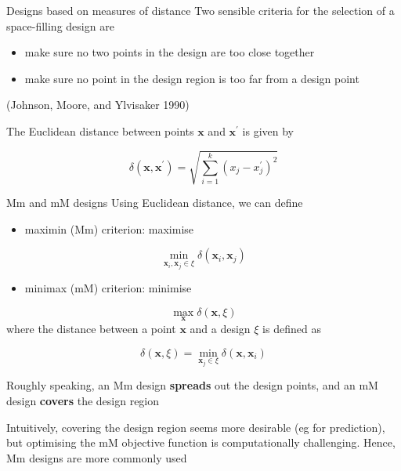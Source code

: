 \documentclass[
  ignorenonframetext,
]{beamer}
\providecommand{\tightlist}{%
  \setlength{\itemsep}{0pt}\setlength{\parskip}{0pt}}
\begin{document}
\begin{frame}{Designs based on measures of distance}
\protect\hypertarget{designs-based-on-measures-of-distance}{}
Two sensible criteria for the selection of a space-filling design are

\begin{itemize}
\tightlist
\item
  make sure no two points in the design are too close together
\item
  make sure no point in the design region is too far from a design point
\end{itemize}

(Johnson, Moore, and Ylvisaker 1990)

The Euclidean distance between points \(\boldsymbol{x}\) and
\(\boldsymbol{x}^\prime\) is given by

\[
\delta(\boldsymbol{x}, \boldsymbol{x}^\prime) = \sqrt{\sum_{i=1}^k \left(x_{j} - x^\prime_j\right)^2}
\]
\end{frame}

\begin{frame}{Mm and mM designs}
\protect\hypertarget{mm-and-mm-designs}{}
Using Euclidean distance, we can define

\begin{itemize}
\tightlist
\item
  maximin (Mm) criterion: maximise
\end{itemize}

\[
  \min_{\boldsymbol{x}_i, \boldsymbol{x}_j\in\xi}\delta(\boldsymbol{x}_i, \boldsymbol{x}_j)
  \]

\begin{itemize}
\tightlist
\item
  minimax (mM) criterion: minimise
\end{itemize}

\[
  \max_{\boldsymbol{x}}\delta(\boldsymbol{x}, \xi)
  \] where the distance between a point \(\boldsymbol{x}\) and a design
\(\xi\) is defined as

\[
  \delta(\boldsymbol{x}, \xi) = \min_{\boldsymbol{x}_j\in\xi}\delta(\boldsymbol{x}, \boldsymbol{x}_i)
  \]

Roughly speaking, an Mm design \textbf{spreads} out the design points,
and an mM design \textbf{covers} the design region

Intuitively, covering the design region seems more desirable (eg for
prediction), but optimising the mM objective function is computationally
challenging. Hence, Mm designs are more commonly used
\end{frame}
\end{document}

